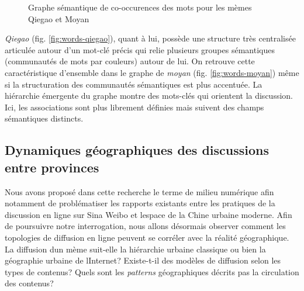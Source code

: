 \begin{figure}[h!]
    \centering
    
  \caption{
    Graphe sémantique de co-occurences des mots pour les mèmes Qiegao et Moyan
  }
\end{figure}


\textit{Qiegao} (fig. \ref{fig:words-qiegao}), quant \`a lui, possède une structure très centralisée articulée autour d{\textquoteright}un mot-clé précis qui relie plusieurs groupes sémantiques (communautés de mots par couleurs) autour de lui. On retrouve cette caractéristique d{\textquoteright}ensemble dans le graphe de \textit{moyan} (fig. \ref{fig:words-moyan}) même si la structuration des communautés sémantiques est plus accentuée. La hiérarchie émergente du graphe montre des mots-clés qui orientent la discussion. Ici, les associations sont plus librement définies mais suivent des champs sémantiques distincts.


\subsection[Dynamiques géographiques des discussions entre provinces]{Dynamiques géographiques des discussions entre provinces}

Nous avons proposé dans cette recherche le terme de milieu numérique afin notamment de problématiser les rapports existants entre les pratiques de la discussion en ligne sur Sina Weibo et l{\textquotesingle}espace de la Chine urbaine moderne. Afin de poursuivre notre interrogation, nous allons désormais observer comment les topologies de diffusion en ligne peuvent se corréler avec la réalité géographique. La diffusion d{\textquotesingle}un mème suit-elle la hiérarchie urbaine classique ou bien la géographie urbaine de l{\textquotesingle}Internet? Existe-t-il des modèles de diffusion selon les types de contenus? Quels sont les \textit{patterns }géographiques décrits pas la circulation des contenus? 

